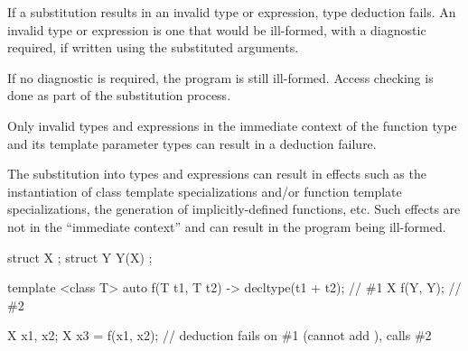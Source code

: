 \pnum
If a substitution results in an invalid type or expression, type deduction fails. An
invalid type or expression is one that would be ill-formed, with a diagnostic
required, if written using the substituted arguments. \begin{note} If no
diagnostic is required, the program is still ill-formed. Access checking is done
as part of the substitution
process. \end{note} Only invalid types and expressions in the immediate
context of the function type and its template parameter types can result in a deduction
failure. \begin{note} The substitution into types and expressions can result
in effects such as the instantiation of class template specializations and/or
function template specializations, the generation of implicitly-defined functions,
etc. Such effects are not in the ``immediate context'' and can result in the
program being ill-formed.\end{note}

\begin{example}
\begin{codeblock}
struct X { };
struct Y {
  Y(X){}
};

template <class T> auto f(T t1, T t2) -> decltype(t1 + t2); // \#1
X f(Y, Y);  // \#2

X x1, x2;
X x3 = f(x1, x2);  // deduction fails on \#1 (cannot add ), calls \#2\end{codeblock}
\end{example}

